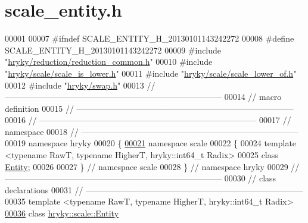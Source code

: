 \hypertarget{scale__entity_8h_source}{\section{scale\-\_\-entity.\-h}
}

\begin{DoxyCode}
00001 
00007 \textcolor{preprocessor}{#ifndef SCALE\_ENTITY\_H\_20130101143242272}
00008 \textcolor{preprocessor}{}\textcolor{preprocessor}{#define SCALE\_ENTITY\_H\_20130101143242272}
00009 \textcolor{preprocessor}{}\textcolor{preprocessor}{#include "\hyperlink{reduction__common_8h}{hryky/reduction/reduction_common.h}"}
00010 \textcolor{preprocessor}{#include "\hyperlink{scale__is__lower_8h}{hryky/scale/scale_is_lower.h}"}
00011 \textcolor{preprocessor}{#include "\hyperlink{scale__lower__of_8h}{hryky/scale/scale_lower_of.h}"}
00012 \textcolor{preprocessor}{#include "\hyperlink{swap_8h}{hryky/swap.h}"}
00013 \textcolor{comment}{//
      ------------------------------------------------------------------------------}
00014 \textcolor{comment}{// macro definition}
00015 \textcolor{comment}{//
      ------------------------------------------------------------------------------}
00016 \textcolor{comment}{//
      ------------------------------------------------------------------------------}
00017 \textcolor{comment}{// namespace}
00018 \textcolor{comment}{//
      ------------------------------------------------------------------------------}
00019 \textcolor{keyword}{namespace }hryky
00020 \{
\hypertarget{scale__entity_8h_source_l00021}{}\hyperlink{namespacehryky_1_1scale}{00021} \textcolor{keyword}{namespace }scale
00022 \{
00024     \textcolor{keyword}{template} <\textcolor{keyword}{typename} RawT, \textcolor{keyword}{typename} HigherT, hryky::\textcolor{keywordtype}{int}64\_t Radix>
00025     \textcolor{keyword}{class }\hyperlink{classhryky_1_1scale_1_1_entity}{Entity};
00026 
00027 \} \textcolor{comment}{// namespace scale}
00028 \} \textcolor{comment}{// namespace hryky}
00029 \textcolor{comment}{//
      ------------------------------------------------------------------------------}
00030 \textcolor{comment}{// class declarations}
00031 \textcolor{comment}{//
      ------------------------------------------------------------------------------}
00035 \textcolor{comment}{}\textcolor{keyword}{template} <\textcolor{keyword}{typename} RawT, \textcolor{keyword}{typename} HigherT, hryky::\textcolor{keywordtype}{int}64\_t Radix>
\hypertarget{scale__entity_8h_source_l00036}{}\hyperlink{classhryky_1_1scale_1_1_entity}{00036} \textcolor{keyword}{class }\hyperlink{classhryky_1_1scale_1_1_entity}{hryky::scale::Entity}

\end{DoxyCode}
